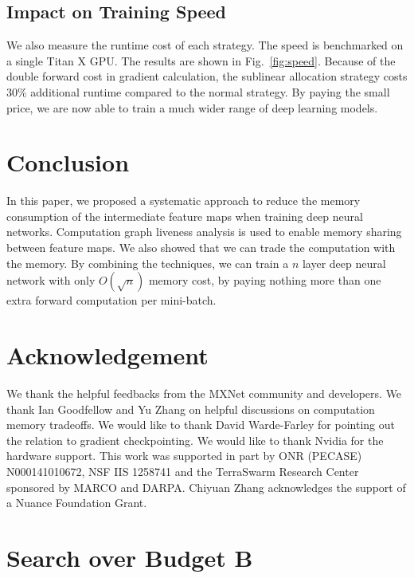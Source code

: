 \documentclass{article} %
\newcommand{\presec}{\vspace*{-2pt}}
\newcommand{\postsec}{\vspace*{-2pt}} %
\begin{document}
\subsection{Impact on Training Speed}


We also measure the runtime cost of each strategy. The speed is benchmarked on a single Titan X GPU.
The results are shown in Fig.~\ref{fig:speed}.
Because of the double forward cost in gradient calculation, the sublinear allocation strategy costs $30$\% additional runtime compared to the normal strategy.
By paying the small price, we are now able to train a much wider range of deep learning models.

\presec
\section{Conclusion}
\postsec
In this paper, we proposed a systematic approach to reduce the memory consumption of the
intermediate feature maps when training deep neural networks.
Computation graph liveness analysis is used to enable memory sharing between feature maps. We also showed that we can trade the computation
with the memory. By combining the techniques, we can train a $n$ layer deep neural network with
only $O(\sqrt{n})$ memory cost, by paying nothing more than one extra forward computation per
mini-batch.

\section*{Acknowledgement}
\begin{small}
We thank the helpful feedbacks from the MXNet community and developers.
We thank Ian Goodfellow and Yu Zhang on helpful discussions on computation memory tradeoffs.
We would like to thank David Warde-Farley for pointing out the relation to gradient checkpointing.
We would like to thank Nvidia for the hardware support.
This work was supported in part by ONR (PECASE) N000141010672, NSF IIS 1258741 and the TerraSwarm Research
Center sponsored by MARCO and DARPA.
Chiyuan Zhang acknowledges the support of a Nuance Foundation Grant.
\end{small}




\appendix
\section{Search over Budget B}
\end{document}
